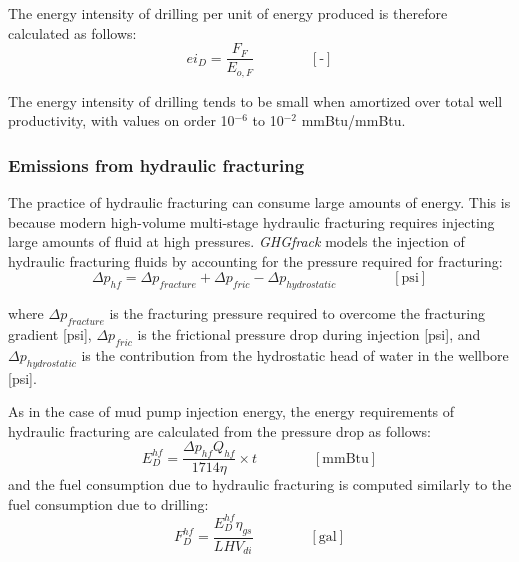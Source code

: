 \documentclass[11pt]{report}
\newcommand{\eqnunit}[1]{\quad\quad \scriptstyle{\left[\text{#1}\right]}}
\begin{document}
The energy intensity of drilling per unit of energy produced is therefore calculated as follows:
\begin{equation}
ei_{D} = \frac{F_{F}}{E_{o,F}} \quad\quad\eqnunit{-}
\end{equation}

The energy intensity of drilling tends to be small when amortized over total well productivity, with values on order 10$^{-6}$ to 10$^{-2}$ mmBtu/mmBtu.

\subsubsection{Emissions from hydraulic fracturing}

The practice of hydraulic fracturing can consume large amounts of energy. This is because modern high-volume multi-stage hydraulic fracturing requires injecting large amounts of fluid at high pressures. \emph{GHGfrack} models the injection of hydraulic fracturing fluids by accounting for the pressure required for fracturing:
\begin{equation}
\Delta p_{hf} = \Delta p_{fracture} + \Delta p_{fric} - \Delta p_{hydrostatic}  \quad\quad\eqnunit{psi} 
\end{equation}

where $\Delta p_{fracture}$ is the fracturing pressure required to overcome the fracturing gradient [psi], $ \Delta p_{fric}$ is the frictional pressure drop during injection [psi], and $\Delta p_{hydrostatic}$ is the contribution from the hydrostatic head of water in the wellbore [psi].

As in the case of mud pump injection energy, the energy requirements of hydraulic fracturing are calculated from the pressure drop as follows:
\begin{equation}
E_{D}^{hf} = \frac{\Delta p_{hf} Q_{hf}}{1714 \eta} \times t \quad\quad\eqnunit{mmBtu} 
\end{equation}
and the fuel consumption due to hydraulic fracturing is computed similarly to the fuel consumption due to drilling:
\begin{equation}
F_{D}^{hf} = \frac{E_{D}^{hf} \eta_{gs}}{LHV_{di}} \quad\quad\eqnunit{gal}
\end{equation}
\end{document}
